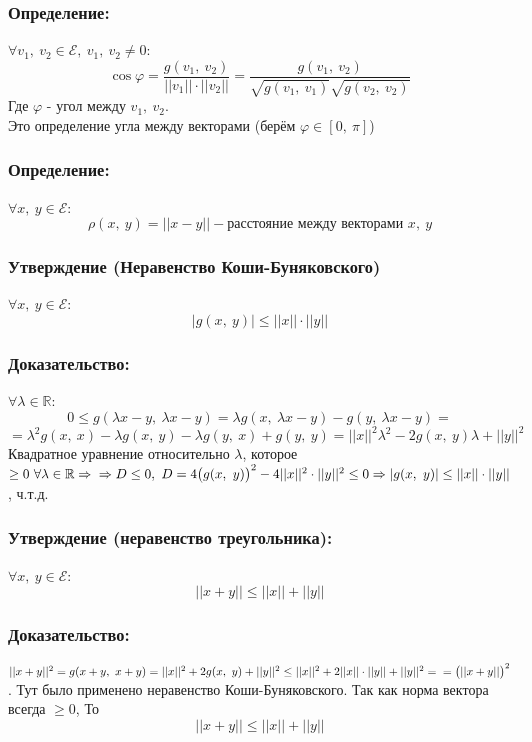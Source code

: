 \documentclass[12pt, letterpaper, twoside]{article}
\newcommand{\mb}[1]{\mathbb{#1}}
\begin{document}
    \subsubsection*{Определение:}
    $\forall v_1,\ v_2\in \mathcal{E},\ v_1,\ v_2 \neq 0$:
    \[\cos \varphi = \frac{g(v_1,\ v_2)}{||v_1||\cdot ||v_2||} = \frac{g(v_1,\ v_2)}{\sqrt{g(v_1,\ v_1)} \sqrt{g(v_2,\ v_2)}}\]
    Где $\varphi$ - угол между $v_1,\ v_2$.\\
    Это определение угла между векторами (берём $\varphi\in [0,\ \pi]$)
    \subsubsection*{Определение:}
    $\forall x,\ y\in \mathcal{E}$:
    \[\rho(x,\ y) = ||x - y|| - \text{расстояние между векторами $x,\ y$}\]
    \subsubsection*{Утверждение (Неравенство Коши-Буняковского)}
    $\forall x,\ y\in \mathcal{E}$:
    \[|g(x,\ y)| \leq ||x||\cdot ||y||\]
    \subsubsection*{Доказательство:}
    $\forall \lambda \in \mb{R}$:
    \[0 \leq g(\lambda x - y,\ \lambda x - y) = \lambda g(x,\ \lambda x - y) - g(y,\ \lambda x - y) =\]
    \[= \lambda^2 g(x,\ x) - \lambda g(x,\ y) - \lambda g(y,\ x) + g(y,\ y) = ||x||^2 \lambda^2 - 2g(x,\ y)\lambda + ||y||^2\]
    Квадратное уравнение относительно $\lambda$, которое $\geq 0\ \forall \lambda\in \mathbb{R}\Rightarrow\\
    \Rightarrow D \leq 0,\ D = 4\big(g(x,\ y)\big)^2 - 4||x||^2\cdot||y||^2\leq 0\Rightarrow |g(x,\ y)|\leq ||x||\cdot ||y||$, ч.т.д.
    \subsubsection*{Утверждение (неравенство треугольника):}
    $\forall x,\ y\in\mathcal{E}$:
    \[||x + y|| \leq ||x|| + ||y||\]
    \subsubsection*{Доказательство:}
    $||x + y||^2 = g(x + y,\ x + y) = ||x||^2 + 2g(x,\ y) + ||y||^2 \leq ||x||^2 + 2||x||\cdot ||y|| + ||y||^2 =\\
    =\big(||x + y||\big)^2$. Тут было применено неравенство Коши-Буняковского. Так как норма вектора всегда $\geq 0$, То
    \[||x + y|| \leq ||x||  + ||y||\]
\end{document}

